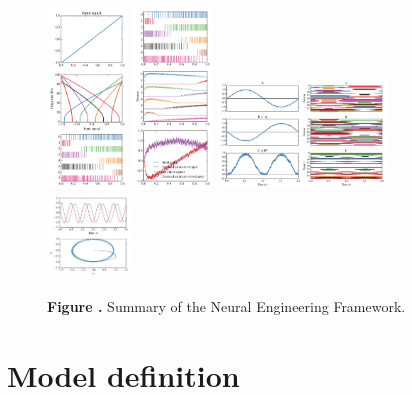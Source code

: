 \documentclass{frontiersSCNS}
\begin{document}
\begin{figure}
\begin{center}
  \includegraphics[width=0.19\textwidth]{nef_summary_enc}
  \includegraphics[width=0.19\textwidth]{nef_summary_dec}
  \includegraphics[width=0.399\textwidth]{nef_summary_trans}
  \includegraphics[width=0.199\textwidth]{nef_summary_dyn}
\end{center}
 \textbf{\label{fig:nef} Figure .}{
   Summary of the Neural Engineering Framework.}
\end{figure}


\section{Model definition}
\end{document}
